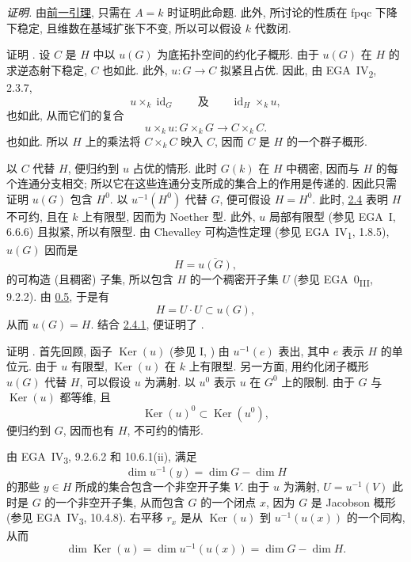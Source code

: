 \noindent\textit{证明.}
由\hyperref[lem:sga3-VIA-2.5.1]{前一引理},
只需在 \(A=k\) 时证明此命题.
此外, 所讨论的性质在 fpqc 下降下稳定,
且维数在基域扩张下不变,
所以可以假设 \(k\) 代数闭.

证明 .
设 \(C\) 是 \(H\) 中以 \(u(G)\) 为底拓扑空间的约化子概形.
由于 \(u(G)\) 在 \(H\) 的求逆态射下稳定, \(C\) 也如此.
此外, \(u:G\to C\) 拟紧且占优.
因此, 由 EGA~IV\textsubscript{2}, 2.3.7,
\[
  u\times_k\operatorname{id}_G
  \qquad\text{及}\qquad
  \operatorname{id}_H\times_ku,
\]
也如此, 从而它们的复合
\[
  u\times_ku:G\times_kG\longrightarrow C\times_kC.
\]
也如此. 所以 \(H\) 上的乘法将 \(C\times_kC\) 映入 \(C\),
因而 \(C\) 是 \(H\) 的一个群子概形.

以 \(C\) 代替 \(H\), 便归约到 \(u\) 占优的情形.
此时 \(G(k)\) 在 \(H\) 中稠密,
因而与 \(H\) 的每个连通分支相交;
所以它在这些连通分支所成的集合上的作用是传递的.
因此只需证明 \(u(G)\) 包含 \(H^0\).
以 \(u^{-1}(H^0)\) 代替 \(G\), 便可假设 \(H=H^0\).
此时, \hyperref[prop:sga3-VIA-2.4]{2.4} 表明 \(H\) 不可约,
且在 \(k\) 上有限型, 因而为 Noether 型.
此外, \(u\) 局部有限型 (参见 EGA~I, 6.6.6) 且拟紧,
所以有限型. 由 Chevalley 可构造性定理
(参见 EGA~IV\textsubscript{1}, 1.8.5),
\(u(G)\) 因而是
\[
  H=\overline{u(G)},
\]
的可构造 (且稠密) 子集,
所以包含 \(H\) 的一个稠密开子集 \(U\)
(参见 EGA~0\textsubscript{III}, 9.2.2).
由 \hyperref[sga3:VIA:0.5]{0.5}, 于是有
\[
  H=U\cdot U\subset u(G),
\]
从而 \(u(G)=H\).
结合 \hyperref[cor:sga3-VIA-2.4.1]{2.4.1},
便证明了 .

证明 .
首先回顾, 函子 \(\operatorname{Ker}(u)\)
(参见 I, )
由 \(u^{-1}(e)\) 表出, 其中 \(e\) 表示 \(H\) 的单位元.
由于 \(u\) 有限型, \(\operatorname{Ker}(u)\) 在 \(k\) 上有限型.
另一方面, 用约化闭子概形 \(u(G)\) 代替 \(H\),
可以假设 \(u\) 为满射.
以 \(u^0\) 表示 \(u\) 在 \(G^0\) 上的限制.
由于 \(G\) 与 \(\operatorname{Ker}(u)\) 都等维,
且
\[
  \operatorname{Ker}(u)^0\subset\operatorname{Ker}(u^0),
\]
便归约到 \(G\), 因而也有 \(H\), 不可约的情形.

由 EGA~IV\textsubscript{3}, 9.2.6.2 和 10.6.1(ii),
满足
\[
  \dim u^{-1}(y)=\dim G-\dim H
\]
的那些 \(y\in H\) 所成的集合包含一个非空开子集 \(V\).
由于 \(u\) 为满射, \(U=u^{-1}(V)\) 此时是 \(G\) 的一个非空开子集,
从而包含 \(G\) 的一个闭点 \(x\),
因为 \(G\) 是 Jacobson 概形 (参见 EGA~IV\textsubscript{3}, 10.4.8).
右平移 \(r_x\) 是从 \(\operatorname{Ker}(u)\) 到
\(u^{-1}(u(x))\) 的一个同构, 从而
\[
  \dim\operatorname{Ker}(u)
    =\dim u^{-1}(u(x))
    =\dim G-\dim H.
\]

